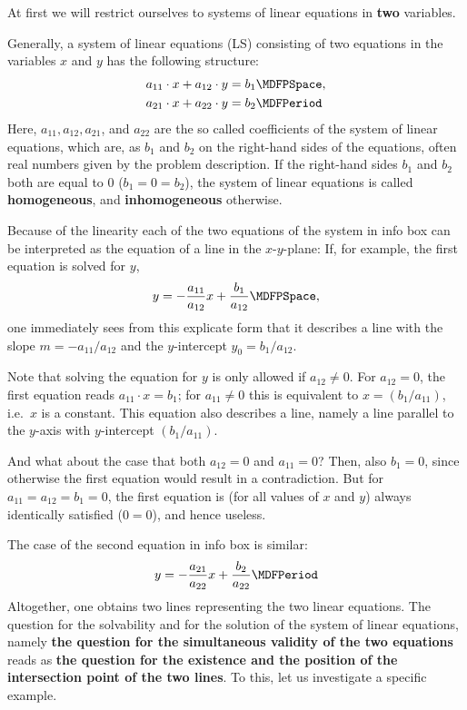 \begin{MIntro}
At first we will restrict ourselves to systems of linear equations in \textbf{two}
variables. 

\begin{MInfo}
Generally, a system of linear equations (LS) consisting of two equations 
in the variables $x$ and $y$ has the following structure:
\begin{eqnarray*}
	a_{11} \cdot x + a_{12} \cdot y &= b_{1} \MDFPSpace, \\ 
	a_{21} \cdot x + a_{22} \cdot y &= b_2 \MDFPeriod
\end{eqnarray*}
Here, $a_{11}, a_{12}, a_{21}$, and $a_{22}$ are the so called coefficients of the system
of linear equations, which are, as $b_1$ and $b_2$ on the right-hand sides of the 
equations, often real numbers given by the problem description.
If the right-hand sides $b_1$ and $b_2$ both are equal to $0$ ($b_1 = 0 = b_2$), 
the system of linear equations is called \textbf{homogeneous}, and \textbf{inhomogeneous}
otherwise.


\end{MInfo}

Because of the linearity each of the two equations of the system in info box 
can be interpreted as the equation of a line in the $x$-$y$-plane: If, for example, the first equation
is solved for $y$,
$$y = - \Mdfrac{a_{11}}{a_{12}} x + \Mdfrac{b_1}{a_{12}} \MDFPSpace ,$$
one immediately sees from this explicate form that it describes a line with the slope 
$m = - a_{11}/a_{12}$ and the $y$-intercept $y_0=b_1/a_{12}$.

Note that solving the equation for $y$ is only allowed if $a_{12} \neq 0$. For $a_{12} = 0$,
the first equation reads $a_{11} \cdot x = b_1$; for $a_{11} \neq 0$ this is equivalent 
to $x = (b_1/a_{11})$, i.e.\ $x$ is a constant. This equation also describes a line, namely 
a line parallel to the $y$-axis with $y$-intercept $(b_1/a_{11})$.

And what about the case that both $a_{12} = 0$ and $a_{11} = 0$? Then, also $b_1 = 0$, since 
otherwise the first equation would result in a contradiction. But for $a_{11} = a_{12} = b_1 = 0$,
the first equation is (for all values of $x$ and $y$) always identically satisfied ($0 = 0$),
and hence useless.

The case of the second equation in info box  is similar:
$$y = - \Mdfrac{a_{21}}{a_{22}} x + \Mdfrac{b_2}{a_{22}} \MDFPeriod$$
Altogether, one obtains two lines representing the two linear equations. The question
for the solvability and for the solution of the system of linear equations, namely 
\textbf{the question for the simultaneous validity of the two equations} reads as \textbf{the question for
the existence and the position of the intersection point of the two lines}. 
To this, let us investigate a specific example.


\end{MIntro}
